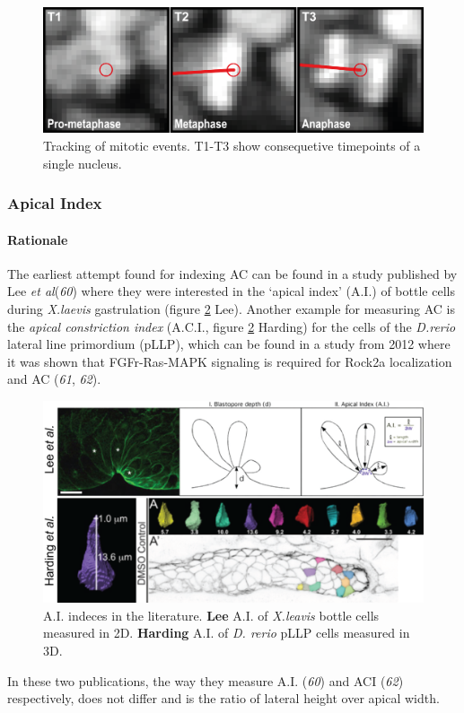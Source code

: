 \documentclass[10pt, b5paper, singlespacinge, twoside]{reedthesis} %
\theoremstyle{definition}
\theoremstyle{definition}
\theoremstyle{definition}
\theoremstyle{remark}
\begin{document}
\begin{figure}[H]

{\centering \includegraphics[width=0.6\linewidth]{figures/materials/prol/Prolif} 

}

\caption[Tracking of mitotic events]{Tracking of mitotic events. T1-T3 show consequetive timepoints of a single nucleus.}\label{fig:mitodatapoints}
\end{figure}
\hypertarget{ACI}{%
\subsubsection{Apical Index}\label{ACI}}

\hypertarget{rationale}{%
\paragraph{Rationale}\label{rationale}}

The earliest attempt found for indexing AC can be found in a study published by Lee \emph{et al}(\emph{60}) where they were interested in the `apical index' (A.I.) of bottle cells during \emph{X.laevis} gastrulation (figure \ref{fig:ACLee} Lee). Another example for measuring AC is the \emph{apical constriction index} (A.C.I., figure \ref{fig:ACLee} Harding) for the cells of the \emph{D.rerio} lateral line primordium (pLLP), which can be found in a study from 2012 where it was shown that FGFr-Ras-MAPK signaling is required for Rock2a localization and AC (\emph{61}, \emph{62}).


\begin{figure}[H]

{\centering \includegraphics[width=0.75\linewidth]{figures/materials/models/ai} 

}

\caption[A.I. indeces in the literature]{A.I. indeces in the literature. \textbf{Lee} A.I. of \emph{X.leavis} bottle cells measured in 2D. \textbf{Harding} A.I. of \emph{D. rerio} pLLP cells measured in 3D.}\label{fig:ACLee}
\end{figure}
\noindent In these two publications, the way they measure A.I. (\emph{60}) and ACI (\emph{62}) respectively, does not differ and is the ratio of lateral height over apical width.
\end{document}
